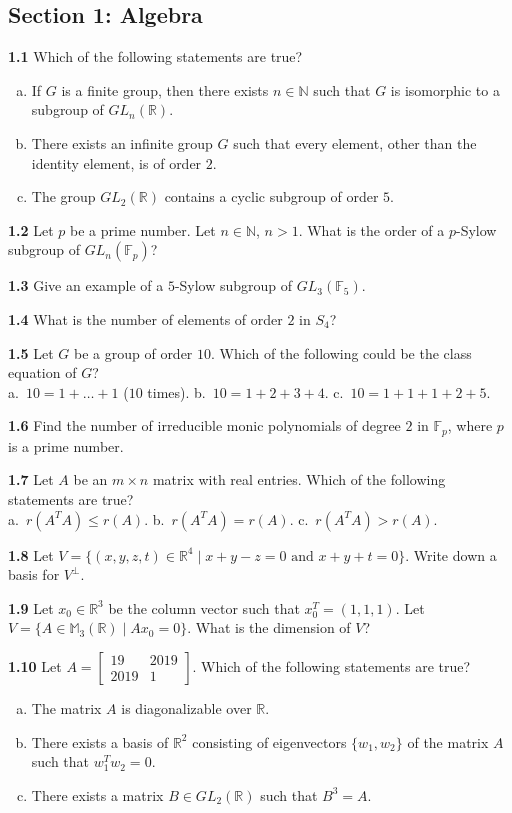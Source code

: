 \documentclass[11pt,a4paper]{article}
\newcommand{\N}{\mathbb{N}}
\newcommand{\R}{\mathbb{R}}
\newcommand{\F}{\mathbb{F}}
\newcommand{\M}{\mathbb{M}}
\newcommand{\examsec}[1]{%
  \subsection*{#1}
  \vspace{-2pt}
}
\newcommand{\qitem}[1]{\par\medskip\noindent\textbf{#1}\hspace{0.5em}}
\begin{document}
\examsec{Section 1: Algebra}

\qitem{1.1} Which of the following statements are true?
\begin{enumerate}[a.]
  \item If $G$ is a finite group, then there exists $n \in \N$ such that $G$ is isomorphic to a subgroup of $GL_n(\R)$.
  \item There exists an infinite group $G$ such that every element, other than the identity element, is of order $2$.
  \item The group $GL_2(\R)$ contains a cyclic subgroup of order $5$.
\end{enumerate}

\qitem{1.2} Let $p$ be a prime number. Let $n \in \N$, $n > 1$. What is the order of a $p$-Sylow subgroup of $GL_n(\F_p)$?

\qitem{1.3} Give an example of a $5$-Sylow subgroup of $GL_3(\F_5)$.

\qitem{1.4} What is the number of elements of order $2$ in $S_4$?

\qitem{1.5} Let $G$ be a group of order $10$. Which of the following could be the class equation of $G$?\\
a.\ $10 = 1 + \dots + 1$ ($10$ times). \qquad b.\ $10 = 1 + 2 + 3 + 4$. \qquad c.\ $10 = 1 + 1 + 1 + 2 + 5$.

\qitem{1.6} Find the number of irreducible monic polynomials of degree $2$ in $\F_p$, where $p$ is a prime number.

\qitem{1.7} Let $A$ be an $m \times n$ matrix with real entries. Which of the following statements are true?\\
a.\ $r(A^T A) \le r(A)$. \qquad b.\ $r(A^T A) = r(A)$. \qquad c.\ $r(A^T A) > r(A)$.

\qitem{1.8} Let $V = \{(x, y, z, t) \in \R^4 \mid x + y - z = 0 \text{ and } x + y + t = 0\}$. Write down a basis for $V^\perp$.

\qitem{1.9} Let $x_0 \in \R^3$ be the column vector such that $x_0^T = (1, 1, 1)$. Let $V = \{A \in \M_3(\R) \mid Ax_0 = 0\}$. What is the dimension of $V$?

\qitem{1.10} Let $A = \begin{bmatrix} 19 & 2019 \\ 2019 & 1 \end{bmatrix}$. Which of the following statements are true?
\begin{enumerate}[a.]
  \item The matrix $A$ is diagonalizable over $\R$.
  \item There exists a basis of $\R^2$ consisting of eigenvectors $\{w_1, w_2\}$ of the matrix $A$ such that $w_1^T w_2 = 0$.
  \item There exists a matrix $B \in GL_2(\R)$ such that $B^3 = A$.
\end{enumerate}
\end{document}
